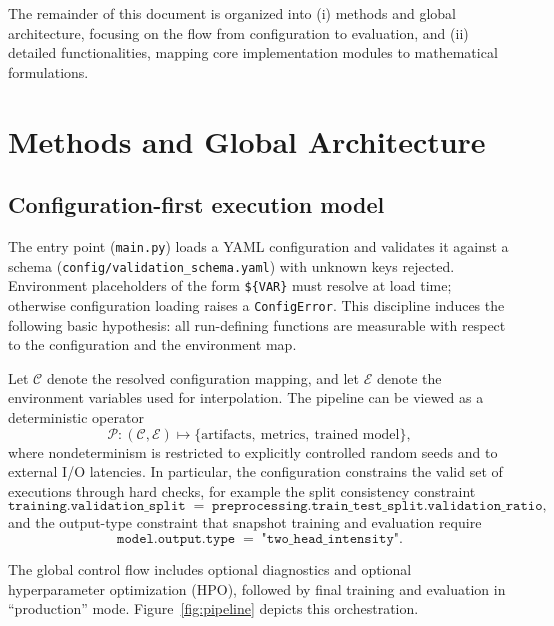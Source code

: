 \documentclass[11pt]{article}
\begin{document}
The remainder of this document is organized into (i) methods and global architecture, focusing on the flow from configuration to evaluation, and (ii) detailed functionalities, mapping core implementation modules to mathematical formulations.

\section{Methods and Global Architecture}

\subsection{Configuration-first execution model}

The entry point (\texttt{main.py}) loads a YAML configuration and validates it against a schema (\texttt{config/validation\_schema.yaml}) with unknown keys rejected. Environment placeholders of the form \texttt{\$\{VAR\}} must resolve at load time; otherwise configuration loading raises a \texttt{ConfigError}. This discipline induces the following basic hypothesis: all run-defining functions are measurable with respect to the configuration and the environment map.

Let $\mathcal{C}$ denote the resolved configuration mapping, and let $\mathcal{E}$ denote the environment variables used for interpolation. The pipeline can be viewed as a deterministic operator
\begin{equation}
  \mathcal{P} : (\mathcal{C}, \mathcal{E}) \mapsto \{\text{artifacts},\ \text{metrics},\ \text{trained model}\},
\end{equation}
where nondeterminism is restricted to explicitly controlled random seeds and to external I/O latencies. In particular, the configuration constrains the valid set of executions through hard checks, for example the split consistency constraint
\begin{equation}
  \texttt{training.validation\_split} \;=\; \texttt{preprocessing.train\_test\_split.validation\_ratio},
\end{equation}
and the output-type constraint that snapshot training and evaluation require
\begin{equation}
  \texttt{model.output.type} \;=\; \texttt{"two\_head\_intensity"}.
\end{equation}

The global control flow includes optional diagnostics and optional hyperparameter optimization (HPO), followed by final training and evaluation in ``production'' mode. Figure~\ref{fig:pipeline} depicts this orchestration.
\end{document}
